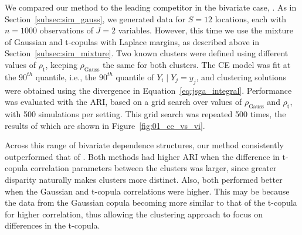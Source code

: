 \documentclass[
  12pt]{article}
\newcommand{\JSGa}{\mathop{\mathrm{JS}^{\mathrm{G}_{\lambda}}}\nolimits}
\newcommand{\rhou}[1]{\rho_{\text{#1}}}
\begin{document}
We compared our method to the leading competitor in the bivariate case, \citet{Vignotto2021}.
As in Section~\ref{subsec:sim_gauss}, we generated data for $S = 12$ locations, each with $n = 1000$ observations of $J = 2$ variables.
However, this time we use the mixture of Gaussian and t-copulas with Laplace margins, as described above in Section~\ref{subsec:sim_mixture}. 
Two known clusters were defined using different values of $\rhou{t}$, keeping $\rhou{Gauss}$ the same for both clusters. %
The CE model was fit at the $90^{th}$ quantile, i.e., the $90^{th}$ quantile of $Y_{i} \mid Y_{j} = y_j$, and clustering solutions were obtained using the divergence in Equation~\eqref{eq:jsga_integral}.
Performance was evaluated with the ARI, based on a grid search over values of $\rhou{Gauss}$ and $\rhou{t}$, with 500 simulations per setting.
This grid search was repeated 500 times, the results of which are shown in Figure~\ref{fig:01_ce_vs_vi}. 

Across this range of bivariate dependence structures, our method consistently outperformed that of \citet{Vignotto2021}. 
Both methods had higher ARI when the difference in t-copula correlation parameters between the clusters was larger, since greater disparity naturally makes clusters more distinct. 
Also, both performed better when the Gaussian and t-copula correlations were higher.
This may be because the data from the Gaussian copula becoming more similar to that of the t-copula for higher correlation, thus allowing the clustering approach to focus on differences in the t-copula.
\end{document}
